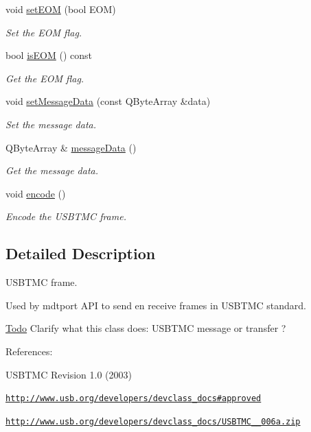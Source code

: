 \begin{DoxyCompactItemize}
void \hyperlink{classmdt_frame_usb_tmc_ab6e494c35eba34905987a75101fc48fe}{setEOM} (bool EOM)
\begin{DoxyCompactList}\small\item\em Set the EOM flag. \end{DoxyCompactList}\item 
bool \hyperlink{classmdt_frame_usb_tmc_a82e93db0fc709b951c0c1f7b70692b5c}{isEOM} () const 
\begin{DoxyCompactList}\small\item\em Get the EOM flag. \end{DoxyCompactList}\item 
void \hyperlink{classmdt_frame_usb_tmc_a7fa61faeaa5d1f5820794c5943b26e26}{setMessageData} (const QByteArray \&data)
\begin{DoxyCompactList}\small\item\em Set the message data. \end{DoxyCompactList}\item 
QByteArray \& \hyperlink{classmdt_frame_usb_tmc_a03d9a1c16099ba7ea1e3a2b0c4e1493e}{messageData} ()
\begin{DoxyCompactList}\small\item\em Get the message data. \end{DoxyCompactList}\item 
void \hyperlink{classmdt_frame_usb_tmc_a9406dddfdd70f5dac729b2dbd728de77}{encode} ()
\begin{DoxyCompactList}\small\item\em Encode the USBTMC frame. \end{DoxyCompactList}\end{DoxyCompactItemize}


\subsection{Detailed Description}
USBTMC frame. 

Used by mdtport API to send en receive frames in USBTMC standard.

\begin{Desc}
\item[\hyperlink{todo__todo000060}{Todo}]Clarify what this class does: USBTMC message or transfer ?\end{Desc}


References:
\begin{DoxyItemize}
\item USBTMC Revision 1.0 (2003)
\item \href{http://www.usb.org/developers/devclass_docs#approved}{\tt http://www.usb.org/developers/devclass\_\-docs\#approved}
\item \href{http://www.usb.org/developers/devclass_docs/USBTMC_1_006a.zip}{\tt http://www.usb.org/developers/devclass\_\-docs/USBTMC\_\_\-006a.zip} 
\end{DoxyItemize}

